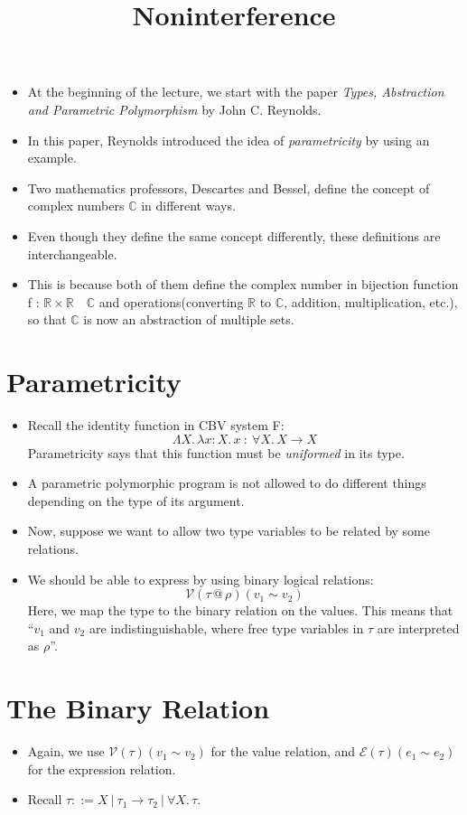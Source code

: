 \documentclass{lecturenotes}
\title{Noninterference}
\makeatletter
\newcommand{\real}{\ensuremath{\mathbb{R}}\xspace}
\newcommand{\complex}{\ensuremath{\mathbb{C}}\xspace}
\newcommand{\tabs}[3]{\ensuremath{\lambda #1 \colon #2.\,#3}}
\newcommand{\prodtype}[2]{\ensuremath{#1 \times #2}}
\newcommand{\fatype}[2]{\ensuremath{\forall #1.\,#2}}
\newcommand{\Abs}[2]{\Lambda #1.\,#2}
\newcommand{\at}{\ensuremath{\mathrel{@}}}
\makeatother
\begin{document}
\maketitle

\begin{itemize}
\item At the beginning of the lecture, we start with the paper \emph{Types, Abstraction and Parametric Polymorphism} by John C. Reynolds.
\item In this paper, Reynolds introduced the idea of \emph{parametricity} by using an example.
\item Two mathematics professors, Descartes and Bessel, define the concept of complex numbers \complex in different ways.
\item Even though they define the same concept differently, these definitions are interchangeable.
\item This is because both of them define the complex number in bijection function \textsf{f : \prodtype{\real}{\real}\ \rightarrow\ \complex}
      and operations(converting \real to \complex, addition, multiplication, etc.), so that \complex is now an abstraction of multiple sets.
\end{itemize}

\section{Parametricity}\label{sec:parametricity}

\begin{itemize}
\item Recall the identity function in CBV system F:
    \[
        \Abs{X}{\tabs{x}{X}{x}}\ :\ \fatype{X}{X \to X}
    \]
    Parametricity says that this function must be \emph{uniformed} in its type.
\item A parametric polymorphic program is not allowed to do different things depending on the type of its argument.
\item Now, suppose we want to allow two type variables to be related by some relations.
\item We should be able to express by using binary logical relations:
    \[
        \mathcal{V}(\tau \at \rho )(v_1 \sim v_2)
    \]
    Here, we map the type to the binary relation on the values. This means that ``$v_1$ and $v_2$ are indistinguishable,
    where free type variables in $\tau$ are interpreted as $\rho$''. 
\end{itemize}

\section{The Binary Relation}\label{sec:the-binary-relation}
\begin{itemize}
    \item Again, we use $\mathcal{V}(\tau)(v_1 \sim v_2)$ for the value relation, and $\mathcal{E}(\tau)(e_1 \sim e_2)$ for the expression relation.
    \item Recall $\tau ::= X\ \vert\ \tau_1 \to \tau_2\ \vert\ \fatype{X}{\tau}$.
\end{itemize}
\end{document}
